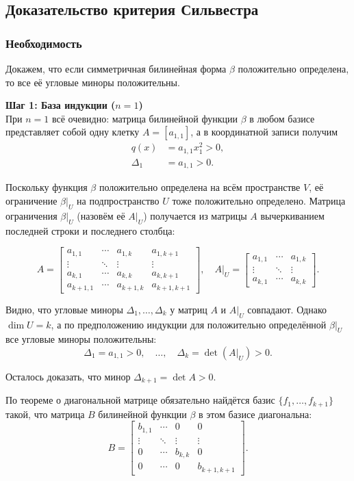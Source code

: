 \documentclass[12pt]{article}
\begin{document}
\subsection*{Доказательство критерия Сильвестра}


\subsubsection*{Необходимость}
Докажем, что если симметричная билинейная форма $\beta$ положительно определена, то все её угловые миноры положительны.

\textbf{Шаг 1: База индукции ($n = 1$)} \\
При $n = 1$ всё очевидно: матрица билинейной функции $\beta$ в любом базисе представляет собой одну клетку $A = [a_{1,1}]$, а в координатной записи получим
\begin{align*}
q(x) &= a_{1,1} x_1^2 > 0, \\
\Delta_1 &= a_{1,1} > 0.
\end{align*}

Поскольку функция $\beta$ положительно определена на всём пространстве $V$, её ограничение $\beta|_U$ на подпространство $U$ тоже положительно определено. Матрица ограничения $\beta|_U$ (назовём её $A|_U$) получается из матрицы $A$ вычеркиванием последней строки и последнего столбца:

\[
A =
\begin{bmatrix}
a_{1,1} & \cdots & a_{1,k} & a_{1,k+1} \\
\vdots & \ddots & \vdots & \vdots \\
a_{k,1} & \cdots & a_{k,k} & a_{k,k+1} \\
a_{k+1,1} & \cdots & a_{k+1,k} & a_{k+1,k+1}
\end{bmatrix}, \quad
A|_U =
\begin{bmatrix}
a_{1,1} & \cdots & a_{1,k} \\
\vdots & \ddots & \vdots \\
a_{k,1} & \cdots & a_{k,k}
\end{bmatrix}.
\]

Видно, что угловые миноры $\Delta_1, \dots, \Delta_k$ у матриц $A$ и $A|_U$ совпадают. Однако $\dim U = k$, а по предположению индукции для положительно определённой $\beta|_U$ все угловые миноры положительны:
\[
\Delta_1 = a_{1,1} > 0, \quad \dots, \quad \Delta_k = \det(A|_U) > 0.
\]

Осталось доказать, что минор $\Delta_{k+1} = \det A > 0$.

По теореме о диагональной матрице обязательно найдётся базис $\{f_1, \dots, f_{k+1}\}$ такой, что матрица $B$ билинейной функции $\beta$ в этом базисе диагональна:
\[
B =
\begin{bmatrix}
b_{1,1} & \cdots & 0 & 0 \\
\vdots & \ddots & \vdots & \vdots \\
0 & \cdots & b_{k,k} & 0 \\
0 & \cdots & 0 & b_{k+1,k+1}
\end{bmatrix}.
\]
\end{document}
